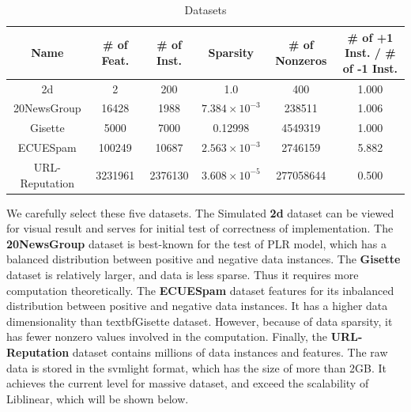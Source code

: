 \documentclass{llncs}
\begin{document}
\begin{table}[h]
\centering
\caption{Datasets}\label{tab:table1}
\begin{tabular}{|c|c|c|c|c|c|}
\hline
    Name           & \# of Feat. & \# of Inst. & Sparsity & \# of Nonzeros & \# of +1 Inst. / \# of -1 Inst.\\
\hline
    2d             & 2             & 200            & 1.0                  & 400                 & 1.000 \\
\hline
    20NewsGroup    & 16428         & 1988           & $7.384\times10^{-3}$ & 238511              & 1.006 \\
\hline
    Gisette        & 5000          & 7000           & 0.12998              & 4549319             & 1.000 \\
\hline
    ECUESpam       & 100249        & 10687          & $2.563\times10^{-3}$ & 2746159             & 5.882 \\
\hline
    URL-Reputation & 3231961       & 2376130        & $3.608\times10^{-5}$ & 277058644           & 0.500 \\
\hline
\end{tabular}
\end{table}
We carefully select these five datasets.
The Simulated \textbf{2d} dataset can be viewed for visual result and serves for initial test of correctness of implementation.
The \textbf{20NewsGroup} dataset is best-known for the test of PLR model, which has a balanced distribution between positive and negative data instances.
The \textbf{Gisette} dataset is relatively larger, and data is less sparse. Thus it requires more computation theoretically.
The \textbf{ECUESpam} dataset features for its inbalanced distribution between positive and negative data instances. It has a higher data dimensionality than textbf{Gisette} dataset. However, because of data sparsity, it has fewer nonzero values involved in the computation.
Finally, the \textbf{URL-Reputation} dataset contains millions of data instances and features. The raw data is stored in the svmlight format, which has the size of more than 2GB. It achieves the current level for massive dataset, and exceed the scalability of Liblinear, which will be shown below.
\end{document}
